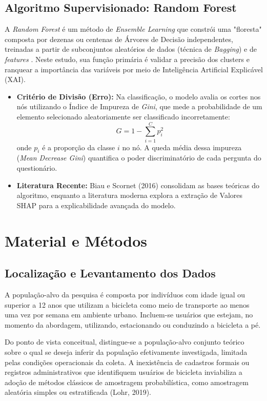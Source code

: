 \documentclass[12pt]{article}
\begin{document}
\subsection{Algoritmo Supervisionado: Random Forest}
A \textit{Random Forest} é um método de \textit{Ensemble Learning} que constrói uma "floresta" composta por dezenas ou centenas de Árvores de Decisão independentes, treinadas a partir de subconjuntos aleatórios de dados (técnica de \textit{Bagging}) e de \textit{features} \cite{breiman2001random}. Neste estudo, sua função primária é validar a precisão dos clusters e ranquear a importância das variáveis por meio de Inteligência Artificial Explicável (XAI).
\begin{itemize}
    \item \textbf{Critério de Divisão (Erro):} Na classificação, o modelo avalia os cortes nos nós utilizando o Índice de Impureza de \textit{Gini}, que mede a probabilidade de um elemento selecionado aleatoriamente ser classificado incorretamente:
    $$ G = 1 - \sum_{i=1}^{C} p_i^2 $$
    onde $p_i$ é a proporção da classe $i$ no nó. A queda média dessa impureza (\textit{Mean Decrease Gini}) quantifica o poder discriminatório de cada pergunta do questionário.
    \item \textbf{Literatura Recente:} Biau e Scornet (2016) \cite{biau2016random} consolidam as bases teóricas do algoritmo, enquanto a literatura moderna explora a extração de Valores SHAP para a explicabilidade avançada do modelo.
\end{itemize}

\section{Material e Métodos}
\subsection{Localização e Levantamento dos Dados}

A população-alvo da pesquisa é composta por indivíduos com idade igual ou superior a 12 anos que utilizam a bicicleta como meio de transporte ao menos uma vez por semana em ambiente urbano. Incluem-se usuários que estejam, no momento da abordagem, utilizando, estacionando ou conduzindo a bicicleta a pé.

Do ponto de vista conceitual, distingue-se a população-alvo conjunto teórico sobre o qual se deseja inferir da população efetivamente investigada, limitada pelas condições operacionais da coleta. A inexistência de cadastros formais ou registros administrativos que identifiquem usuários de bicicleta inviabiliza a adoção de métodos clássicos de amostragem probabilística, como amostragem aleatória simples ou estratificada (Lohr, 2019).
\end{document}
